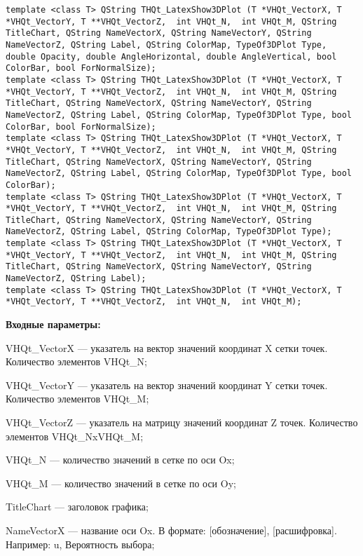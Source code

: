 \documentclass[a4paper,12pt]{article}
\begin{document}
\begin{lstlisting}[label=code_syntax_THQt_LatexShow3DPlot,caption=Синтаксис]
template <class T> QString THQt_LatexShow3DPlot (T *VHQt_VectorX, T *VHQt_VectorY, T **VHQt_VectorZ,  int VHQt_N,  int VHQt_M, QString TitleChart, QString NameVectorX, QString NameVectorY, QString NameVectorZ, QString Label, QString ColorMap, TypeOf3DPlot Type, double Opacity, double AngleHorizontal, double AngleVertical, bool ColorBar, bool ForNormalSize);
template <class T> QString THQt_LatexShow3DPlot (T *VHQt_VectorX, T *VHQt_VectorY, T **VHQt_VectorZ,  int VHQt_N,  int VHQt_M, QString TitleChart, QString NameVectorX, QString NameVectorY, QString NameVectorZ, QString Label, QString ColorMap, TypeOf3DPlot Type, bool ColorBar, bool ForNormalSize);
template <class T> QString THQt_LatexShow3DPlot (T *VHQt_VectorX, T *VHQt_VectorY, T **VHQt_VectorZ,  int VHQt_N,  int VHQt_M, QString TitleChart, QString NameVectorX, QString NameVectorY, QString NameVectorZ, QString Label, QString ColorMap, TypeOf3DPlot Type, bool ColorBar);
template <class T> QString THQt_LatexShow3DPlot (T *VHQt_VectorX, T *VHQt_VectorY, T **VHQt_VectorZ,  int VHQt_N,  int VHQt_M, QString TitleChart, QString NameVectorX, QString NameVectorY, QString NameVectorZ, QString Label, QString ColorMap, TypeOf3DPlot Type);
template <class T> QString THQt_LatexShow3DPlot (T *VHQt_VectorX, T *VHQt_VectorY, T **VHQt_VectorZ,  int VHQt_N,  int VHQt_M, QString TitleChart, QString NameVectorX, QString NameVectorY, QString NameVectorZ, QString Label);
template <class T> QString THQt_LatexShow3DPlot (T *VHQt_VectorX, T *VHQt_VectorY, T **VHQt_VectorZ,  int VHQt_N,  int VHQt_M);
\end{lstlisting}

\textbf{Входные параметры:}
 
VHQt\_VectorX --- указатель на вектор значений координат X сетки точек. Количество элементов VHQt\_N;
 
VHQt\_VectorY --- указатель на вектор значений координат Y сетки точек. Количество элементов VHQt\_M;
 
VHQt\_VectorZ --- указатель на матрицу значений координат Z точек. Количество элементов VHQt\_NxVHQt\_M;
 
VHQt\_N --- количество значений в сетке по оси Ox;
 
VHQt\_M --- количество значений в сетке по оси Oy;
 
TitleChart --- заголовок графика;
 
NameVectorX --- название оси Ox. В формате: [обозначение], [расшифровка]. Например: u, Вероятность выбора;
 
\end{document}
